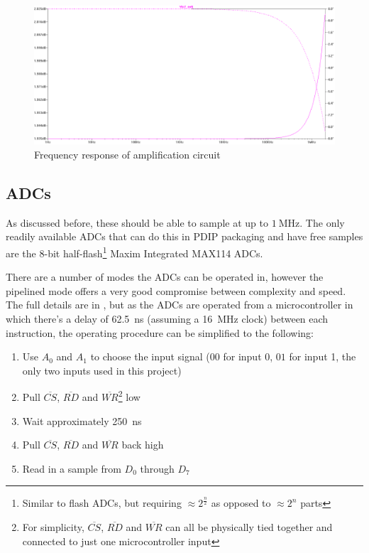 \begin{landscape}
  \begin{figure}[ht]
    \includegraphics[width=\linewidth]{img/amplifier/frequency_response_inverted.png}
    \caption[Amplification Circuit Bode Plot]{Frequency response of amplification circuit}
    \label{fig:amp_sim:freq_response}
  \end{figure}
\end{landscape}


\subsection{ADCs}
\label{sec:adcs}

As discussed before, these should be able to sample at up to $\SI{1}{\MHz}$. The
only readily available ADCs that can do this in PDIP packaging and have free
samples are the 8-bit half-flash\footnote{Similar to flash ADCs, but requiring
$\approx2^{\frac{n}{2}}$ as opposed to $\approx 2^n$ parts} Maxim Integrated
MAX114 ADCs.

There are a number of modes the ADCs can be operated in, however the pipelined
mode offers a very good compromise between complexity and speed. The full
details are in \textcite{MAX114}, but as the ADCs are operated from a
microcontroller in which there's a delay of \SI{62.5}{\ns} (assuming a
\SI{16}{\MHz} clock) between each instruction, the operating procedure can be
simplified to the following:

\begin{enumerate}
  \item Use $A_0$ and $A_1$ to choose the input signal ($00$ for input 0, $01$
  for input 1, the only two inputs used in this project)
  \item Pull $\overline{CS}$, $\overline{RD}$ and $\overline{WR}$\footnote{For
  simplicity, $\overline{CS}$, $\overline{RD}$ and $\overline{WR}$ can all be
  physically tied together and connected to just one microcontroller input} low
  \item Wait approximately \SI{250}{\ns}
  \item Pull $\overline{CS}$, $\overline{RD}$ and $\overline{WR}$ back high
  \item Read in a sample from $D_0$ through $D_7$
\end{enumerate}

